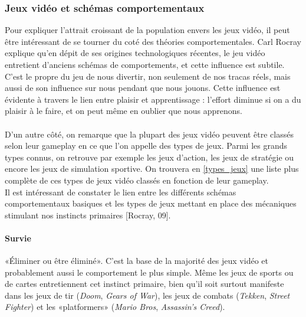 	\subsubsection{Jeux vidéo et schémas comportementaux}
Pour expliquer l'attrait croissant de la population envers les jeux vidéo, il peut être intéressant de se tourner du coté des théories comportementales. Carl Rocray \cite{Rocr09} explique qu'en dépit de ses origines technologiques récentes, le jeu vidéo entretient d’anciens schémas de comportements, et cette influence est subtile. C’est le propre du jeu de nous divertir, non seulement de nos tracas réels, mais aussi de son influence sur nous pendant que nous jouons. Cette influence est évidente à travers le lien entre plaisir et apprentissage : l’effort diminue si on a du plaisir à le faire, et on peut même en oublier que nous apprenons.

\paragraph{}D'un autre côté, on remarque que la plupart des jeux vidéo peuvent être classés selon leur gameplay en ce que l'on appelle des types de jeux. Parmi les grands types connus, on retrouve par exemple les jeux d'action, les jeux de stratégie ou encore les jeux de simulation sportive. On trouvera en \ref{types_jeux} une liste plus complète de ces types de jeux vidéo classés en fonction de leur gameplay. \\

Il est intéressant de constater le lien entre les différents schémas comportementaux basiques et les types de jeux mettant en place des mécaniques stimulant nos instincts primaires [Rocray, 09]\cite{Rocr09}.

\paragraph{}
		\paragraph{Survie \\ \quad}
«Éliminer ou être éliminé». C’est la base de la majorité des jeux vidéo et probablement aussi le comportement le plus simple. Même les jeux de sports ou de cartes entretiennent cet instinct primaire, bien qu’il soit surtout manifeste dans les jeux de tir (\emph{Doom}, \emph{Gears of War}), les jeux de combats (\emph{Tekken}, \emph{Street Fighter}) et les «platformers» (\emph{Mario Bros}, \emph{Assassin’s Creed}).
